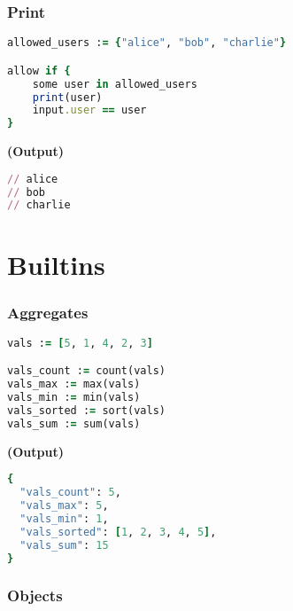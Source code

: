 \documentclass[twocolumn]{article}
\begin{document}
\vspace{-1em}
\subsubsection*{Print}

\begin{lstlisting}[language=Ruby]
allowed_users := {"alice", "bob", "charlie"}

allow if {
	some user in allowed_users
	print(user)
	input.user == user
}
\end{lstlisting}



\textbf{\tiny{(Output)}}
\begin{lstlisting}[language=Ruby]
// alice
// bob
// charlie

\end{lstlisting}






\pagebreak


\section*{Builtins}




\vspace{-1em}
\subsubsection*{Aggregates}

\begin{lstlisting}[language=Ruby]
vals := [5, 1, 4, 2, 3]

vals_count := count(vals)
vals_max := max(vals)
vals_min := min(vals)
vals_sorted := sort(vals)
vals_sum := sum(vals)
\end{lstlisting}



\textbf{\tiny{(Output)}}
\begin{lstlisting}[language=Ruby]
{
  "vals_count": 5,
  "vals_max": 5,
  "vals_min": 1,
  "vals_sorted": [1, 2, 3, 4, 5],
  "vals_sum": 15
}
\end{lstlisting}



\vspace{-1em}
\subsubsection*{Objects}
\end{document}
